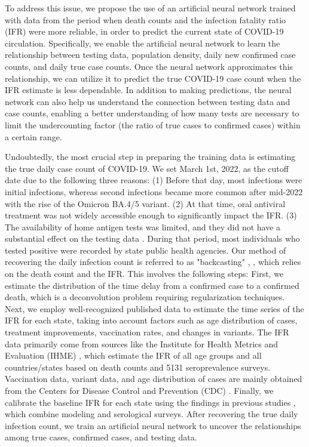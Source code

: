 \documentclass[sn-mathphys,Numbered]{sn-jnl}
\begin{document}
To address this issue, we propose the use of an artificial neural network trained with data from the period when death counts and the infection fatality ratio (IFR) were more reliable, in order to predict the current state of COVID-19 circulation. Specifically, we enable the artificial neural network to learn the relationship between testing data, population density, daily new confirmed case counts, and daily true case counts. Once the neural network approximates this relationship, we can utilize it to predict the true COVID-19 case count when the IFR estimate is less dependable. In addition to making predictions, the neural network can also help us understand the connection between testing data and case counts, enabling a better understanding of how many tests are necessary to limit the undercounting factor (the ratio of true cases to confirmed cases) within a certain range.




Undoubtedly, the most crucial step in preparing the training data is estimating the true daily case count of COVID-19. We set March 1st, 2022, as the cutoff date due to the following three reasons: (1) Before that day, most infections were initial infections, whereas second infections became more common after mid-2022 with the rise of the Omicron BA.4/5 variant. (2) At that time, oral antiviral treatment was not widely accessible enough to significantly impact the IFR. (3) The availability of home antigen tests was limited, and they did not have a substantial effect on the testing data \cite{park2023unreported}. During that period, most individuals who tested positive were recorded by state public health agencies. Our method of recovering the daily infection count is referred to as "backcasting"  \cite{kevrekidis2022backcasting,TrueInfection2}, , which relies on the death count and the IFR. This involves the following steps: First, we estimate the distribution of the time delay from a confirmed case to a confirmed death, which is a deconvolution problem requiring regularization techniques. Next, we employ well-recognized published data to estimate the time series of the IFR for each state, taking into account factors such as age distribution of cases, treatment improvements, vaccination rates, and changes in variants. The IFR data primarily come from sources like the Institute for Health Metrics and Evaluation (IHME) \cite{IHME}, which estimate the IFR of all age groups and all countries/states based on death counts and 5131 seroprevalence surveys. Vaccination data, variant data, and age distribution of cases are mainly obtained from the Centers for Disease Control and Prevention (CDC) \cite{CDCvacrate, CDCvacstat, CDCcaserate, CDCvariant}. Finally, we calibrate the baseline IFR for each state using the findings in previous studies \cite{TrueInfection1, IHME}, which combine modeling and serological surveys. After recovering the true daily infection count, we train an artificial neural network to uncover the relationships among true cases, confirmed cases, and testing data.
\end{document}
